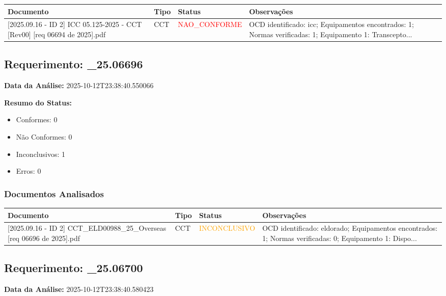 \documentclass[12pt,a4paper]{article}
\begin{document}
\begin{longtable}{|p{4cm}|p{2cm}|p{2cm}|p{6cm}|}
\hline
\textbf{Documento} & \textbf{Tipo} & \textbf{Status} & \textbf{Observações} \\
\hline
\endhead
[Certificado de Conformidade Técnica - CCT][2025.09.16 - ID 2] ICC 05.125-2025 - CCT [Rev00] [req 06694 de  2025].pdf & CCT & \textcolor{red}{NAO\_CONFORME} & OCD identificado: icc; Equipamentos encontrados: 1; Normas verificadas: 1; Equipamento 1: Transcepto... \\
\hline
\end{longtable}


\subsection{Requerimento: \_25.06696}

\textbf{Data da Análise:} 2025-10-12T23:38:40.550066

\textbf{Resumo do Status:}
\begin{itemize}
    \item Conformes: 0
    \item Não Conformes: 0
    \item Inconclusivos: 1
    \item Erros: 0
\end{itemize}

\subsubsection{Documentos Analisados}

\begin{longtable}{|p{4cm}|p{2cm}|p{2cm}|p{6cm}|}
\hline
\textbf{Documento} & \textbf{Tipo} & \textbf{Status} & \textbf{Observações} \\
\hline
\endhead
[Certificado de Conformidade Técnica - CCT][2025.09.16 - ID 2] CCT\_ELD00988\_25\_Overseas [req 06696 de  2025].pdf & CCT & \textcolor{orange}{INCONCLUSIVO} & OCD identificado: eldorado; Equipamentos encontrados: 1; Normas verificadas: 0; Equipamento 1: Dispo... \\
\hline
\end{longtable}


\subsection{Requerimento: \_25.06700}

\textbf{Data da Análise:} 2025-10-12T23:38:40.580423
\end{document}

